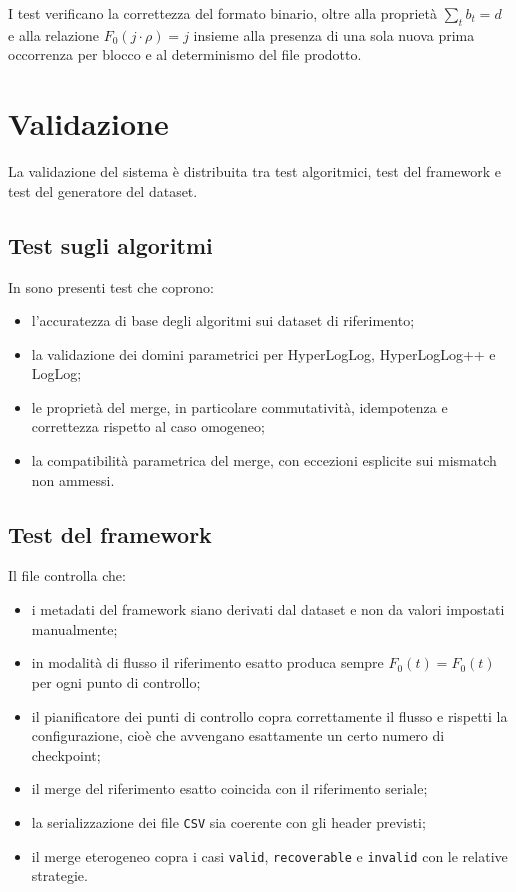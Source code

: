 I test verificano la correttezza del formato binario, oltre alla proprietà
\(\sum_t b_t = d\) e alla relazione \(F_0(j\cdot\rho)=j\) insieme alla presenza
di una sola nuova prima occorrenza per blocco e al determinismo del file
prodotto.

\section{Validazione}

La validazione del sistema è distribuita tra test algoritmici, test del
framework e test del generatore del dataset.

\subsection{Test sugli algoritmi}

In  sono presenti test che coprono:
\begin{itemize}
    \item l'accuratezza di base degli algoritmi sui dataset di riferimento;
    \item la validazione dei domini parametrici per HyperLogLog,
    HyperLogLog++ e LogLog;
    \item le proprietà del merge, in particolare commutatività, idempotenza e
    correttezza rispetto al caso omogeneo;
    \item la compatibilità parametrica del merge, con eccezioni esplicite sui
    mismatch non ammessi.
\end{itemize}

\subsection{Test del framework}

Il file  controlla che:
\begin{itemize}
    \item i metadati del framework siano derivati dal dataset e non da valori
    impostati manualmente;
    \item in modalità di flusso il riferimento esatto produca sempre
    \(\hat{F}_0(t)=F_0(t)\) per ogni punto di controllo;
    \item il pianificatore dei punti di controllo copra correttamente il flusso e rispetti la configurazione, cio\`e che avvengano esattamente un certo numero di checkpoint;
    \item il merge del riferimento esatto coincida con il riferimento seriale;
    \item la serializzazione dei file \texttt{CSV} sia coerente con gli header
    previsti;
    \item il merge eterogeneo copra i casi \texttt{valid},
    \texttt{recoverable} e \texttt{invalid} con le relative strategie.
\end{itemize}

